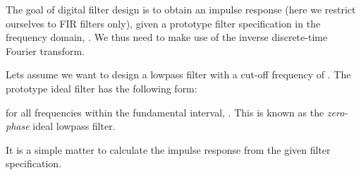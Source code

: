 \documentclass{article}
\begin{document}
\begin{CellGroup}


The goal of digital filter design is to obtain an impulse response  (here we restrict ourselves to FIR filters only), given
a prototype filter specification in the frequency domain, . We thus need to make use of the inverse discrete-time Fourier
transform.



Lets assume we want to design a lowpass filter with a cut-off frequency of . The prototype
ideal filter has the following form:




for all frequencies within the fundamental interval, \inlineTFinmath{-\pi \leq \omega \leq \pi }. This is known as the {\itshape zero-phase} ideal
lowpass filter.



It is a simple matter to calculate the impulse response from the given filter specification.

\begin{CellGroup}

\end{CellGroup}
\begin{CellGroup}

\end{CellGroup}
\begin{CellGroup}




\end{CellGroup}
\end{CellGroup}
\end{document}
